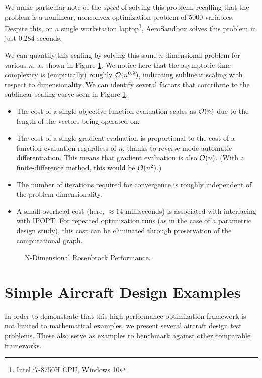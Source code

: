 We make particular note of the \textit{speed} of solving this problem, recalling that the problem is a nonlinear, nonconvex optimization problem of $5000$ variables. Despite this, on a single workstation laptop\footnote{Intel i7-8750H CPU, Windows 10}, AeroSandbox solves this problem in just 0.284 seconds.

We can quantify this scaling by solving this same $n$-dimensional problem for various $n$, as shown in Figure \ref{fig:nd-rosen}. We notice here that the asymptotic time complexity is (empirically) roughly $\mathcal{O}(n^{0.9})$, indicating sublinear scaling with respect to dimensionality. We can identify several factors that contribute to the sublinear scaling curve seen in Figure \ref{fig:nd-rosen}:

\begin{itemize}
    \item The cost of a single objective function evaluation scales as $\mathcal{O}(n)$ due to the length of the vectors being operated on.
    \item The cost of a single gradient evaluation is proportional to the cost of a function evaluation regardless of $n$, thanks to reverse-mode automatic differentiation. This means that gradient evaluation is also $\mathcal{O}(n)$. (With a finite-difference method, this would be $\mathcal{O}(n^2)$.)
    \item The number of iterations required for convergence is roughly independent of the problem dimensionality.
    \item A small overhead cost (here, $\approx 14$ milliseconds) is associated with interfacing with IPOPT. For repeated optimization runs (as in the case of a parametric design study), this cost can be eliminated through preservation of the computational graph. %
\end{itemize}

\begin{figure}[H]
    \centering
    \ifdraft{}{}
    \caption{N-Dimensional Rosenbrock Performance. }
    \label{fig:nd-rosen}
\end{figure}


\section{Simple Aircraft Design Examples}

In order to demonstrate that this high-performance optimization framework is not limited to mathematical examples, we present several aircraft design test problems. These also serve as examples to benchmark against other comparable frameworks.

